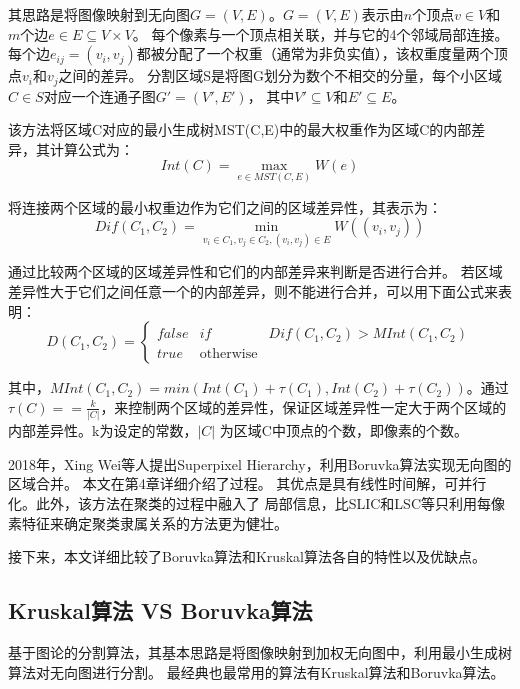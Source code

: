 其思路是将图像映射到无向图$G=(V,E)$。$G=(V,E)$表示由$n$个顶点$v\in V$和$m$个边$e\in E\subseteq V\times V$。
每个像素与一个顶点相关联，并与它的4个邻域局部连接。
每个边$e_{ij}=(v_i,v_j)$都被分配了一个权重（通常为非负实值），该权重度量两个顶点$v_i$和$v_j$之间的差异。
分割区域S是将图G划分为数个不相交的分量，每个小区域$C\in S$对应一个连通子图${G}'=({V}',{E}')$，
其中${V}'\subseteq V$和${E}'\subseteq E$。

该方法将区域C对应的最小生成树MST(C,E)中的最大权重作为区域C的内部差异，其计算公式为：
\begin{equation}
Int(C) = \max_{e\in MST(C,E)}W(e)
\end{equation}

将连接两个区域的最小权重边作为它们之间的区域差异性，其表示为：
\begin{equation}
Dif(C_1,C_2)=\min_{v_i\in C_1,v_j\in C_2,(v_i,v_j)\in E}W((v_i,v_j))
\end{equation}

通过比较两个区域的区域差异性和它们的内部差异来判断是否进行合并。
若区域差异性大于它们之间任意一个的内部差异，则不能进行合并，可以用下面公式来表明：
\begin{equation}
D(C_1,C_2)=
\left\{\begin{matrix}
false & if & Dif(C_1,C_2)> MInt(C_1,C_2) \\
true & \text{otherwise}
\end{matrix}\right.
\end{equation}

其中，$MInt(C_1,C_2)=min(Int(C_1)+\tau(C_1),Int(C_2)+\tau(C_2))$。通过$\tau(C)= = \frac{k}{\left | C\right |}$，来控制两个区域的差异性，保证区域差异性一定大于两个区域的内部差异性。k为设定的常数，$\left | C\right |$ 为区域C中顶点的个数，即像素的个数。

2018年，Xing Wei等人提出Superpixel Hierarchy，利用Boruvka算法实现无向图的区域合并。
本文在第4章详细介绍了过程。
其优点是具有线性时间解，可并行化。此外，该方法在聚类的过程中融入了
局部信息，比SLIC和LSC等只利用每像素特征来确定聚类隶属关系的方法更为健壮。

接下来，本文详细比较了Boruvka算法和Kruskal算法各自的特性以及优缺点。

\subsection{Kruskal算法 VS Boruvka算法}

基于图论的分割算法，其基本思路是将图像映射到加权无向图中，利用最小生成树算法对无向图进行分割。
最经典也最常用的算法有Kruskal算法和Boruvka算法。


